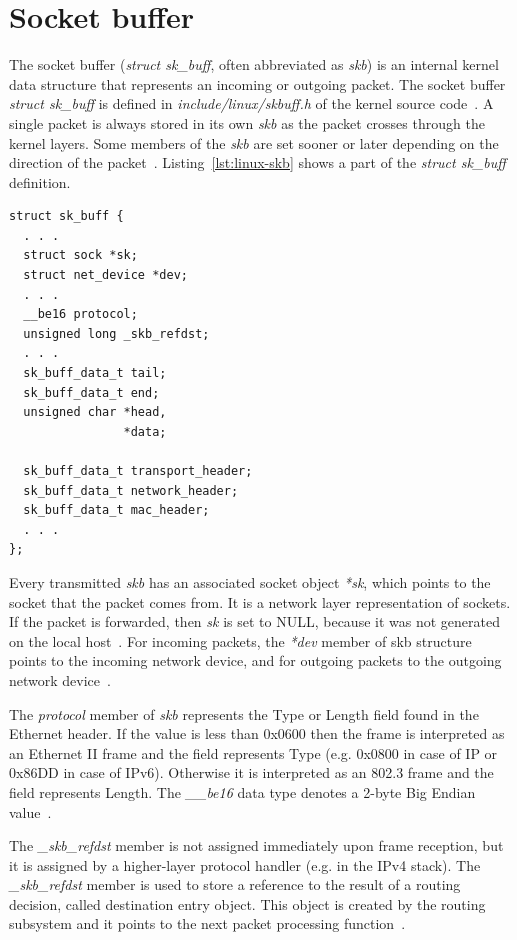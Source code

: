 
\section{Socket buffer}
The socket buffer ({\it{struct sk\_buff}}, often abbreviated as {\it{skb}}) is an internal kernel data structure that
represents an incoming or outgoing packet.
The socket buffer {\it{struct sk\_buff}} is defined in {\it{include/linux/skbuff.h}} of the kernel source code~\cite{kernel-source}.
A single packet is always stored in its own {\it{skb}}
as the packet crosses through the kernel layers.
Some members of the {\it{skb}} are set sooner or later depending on the direction of the packet~\cite{linux-kernel-networking}.
Listing~\ref{lst:linux-skb} shows a part of the {\it{struct sk\_buff}} definition.
\bigskip
\bigskip
\begin{lstlisting}[caption={Notable members of struct sk\_buff},label={lst:linux-skb}]
struct sk_buff {
  . . .
  struct sock *sk;
  struct net_device *dev;
  . . .
  __be16 protocol;
  unsigned long _skb_refdst;
  . . .
  sk_buff_data_t tail;
  sk_buff_data_t end;
  unsigned char *head,
                *data;

  sk_buff_data_t transport_header;
  sk_buff_data_t network_header;
  sk_buff_data_t mac_header;
  . . .
};
\end{lstlisting}
\bigskip
Every transmitted {\it{skb}} has an associated socket object {\it{*sk}},
which points to the socket that the packet comes from.
It is a network layer representation of sockets.
If the packet is forwarded, then {\it{sk}} is set to NULL,
because it was not generated on the local host~\cite{linux-kernel-networking}.
For incoming packets, the {\it{*dev}} member of skb structure points to the incoming network device,
and for outgoing packets to the outgoing network device~\cite{linux-kernel-networking}.

The {\it{protocol}} member of {\it{skb}} represents the Type or Length field found in the Ethernet header.
If the value is less than 0x0600 then the frame is interpreted as an Ethernet II frame and the field represents Type
(e.g. 0x0800 in case of IP or 0x86DD in case of IPv6).
Otherwise it is interpreted as an 802.3 frame and the field represents Length.
The {\it{\_\_be16}} data type denotes a 2-byte Big Endian value~\cite{kernel-source}.

The {\it{\_skb\_refdst}} member is not assigned immediately upon frame reception,
but it is assigned by a higher-layer protocol handler (e.g. in the IPv4 stack).
The {\it{\_skb\_refdst}} member is used to store a reference to the result of a routing decision,
called destination entry object.
This object is created by the routing subsystem
and it points to the next packet processing function~\cite{linux-kernel-networking}.

